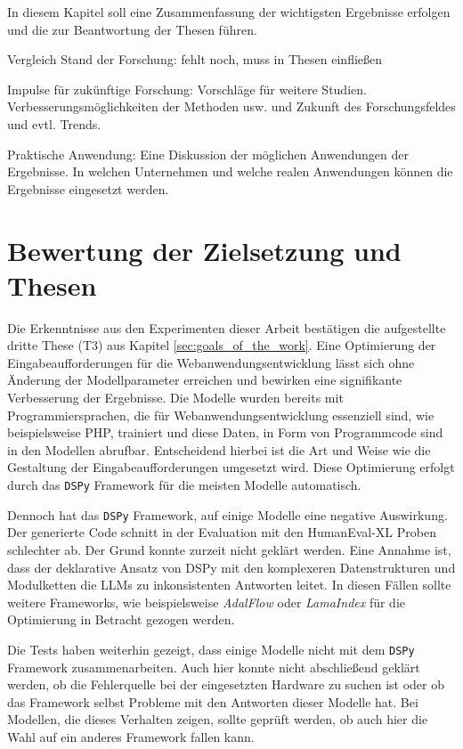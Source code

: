 In diesem Kapitel soll eine Zusammenfassung der wichtigsten Ergebnisse erfolgen und die zur Beantwortung der Thesen führen.

Vergleich Stand der Forschung: fehlt noch, muss in Thesen einfließen

Impulse für zukünftige Forschung: Vorschläge für weitere Studien. Verbesserungsmöglichkeiten der Methoden usw. und Zukunft des Forschungsfeldes und evtl. Trends.

Praktische Anwendung: Eine Diskussion der möglichen Anwendungen der Ergebnisse. In welchen Unternehmen und welche realen Anwendungen können die Ergebnisse eingesetzt werden.

\section{Bewertung der Zielsetzung und Thesen}
Die Erkenntnisse aus den Experimenten dieser Arbeit bestätigen die aufgestellte dritte These (T3) aus Kapitel \ref{sec:goals_of_the_work}. Eine Optimierung der Eingabeaufforderungen für die Webanwendungsentwicklung lässt sich ohne Änderung der Modellparameter erreichen und bewirken eine signifikante Verbesserung der Ergebnisse. Die Modelle wurden bereits mit Programmiersprachen, die für Webanwendungsentwicklung essenziell sind, wie beispielsweise PHP, trainiert und diese Daten, in Form von Programmcode sind in den Modellen abrufbar. Entscheidend hierbei ist die Art und Weise wie die Gestaltung der Eingabeaufforderungen umgesetzt wird. Diese Optimierung erfolgt durch das \texttt{DSPy} Framework für die meisten Modelle automatisch.\vspace{0.2cm}

Dennoch hat das \texttt{DSPy} Framework, auf einige Modelle eine negative Auswirkung. Der generierte Code schnitt in der Evaluation mit den HumanEval-XL Proben schlechter ab. Der Grund konnte zurzeit nicht geklärt werden. Eine Annahme ist, dass der deklarative Ansatz von DSPy mit den komplexeren Datenstrukturen und Modulketten die LLMs zu inkonsistenten Antworten leitet. In diesen Fällen sollte weitere Frameworks, wie beispielsweise \textit{AdalFlow} oder \textit{LamaIndex} für die Optimierung in Betracht gezogen werden.\vspace{0.2cm}

Die Tests haben weiterhin gezeigt, dass einige Modelle nicht mit dem \texttt{DSPy} Framework zusammenarbeiten. Auch hier konnte nicht abschließend geklärt werden, ob die Fehlerquelle bei der eingesetzten Hardware zu suchen ist oder ob das Framework selbst Probleme mit den Antworten dieser Modelle hat. Bei Modellen, die dieses Verhalten zeigen, sollte geprüft werden, ob auch hier die Wahl auf ein anderes Framework fallen kann.\vspace{0.2cm}

